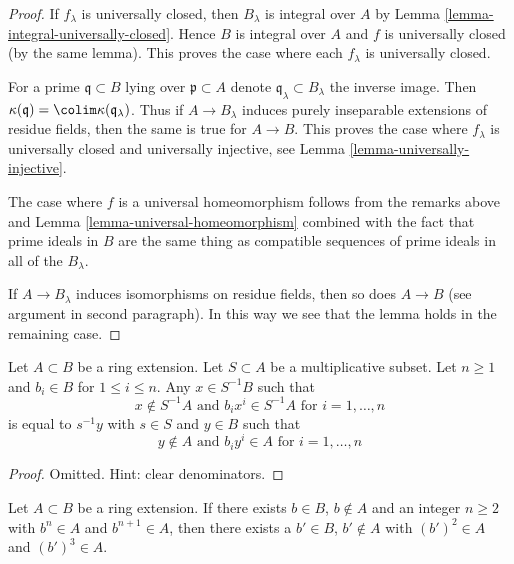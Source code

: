 \begin{proof}
If $f_\lambda$ is universally closed, then
$B_\lambda$ is integral over $A$ by
Lemma \ref{lemma-integral-universally-closed}.
Hence $B$ is integral over $A$ and $f$
is universally closed (by the same lemma).
This proves the case where each $f_\lambda$ is universally closed.

\medskip\noindent
For a prime $\mathfrak q \subset B$ lying over $\mathfrak p \subset A$
denote $\mathfrak q_\lambda \subset B_\lambda$ the inverse image.
Then $\kappa(\mathfrak q) = \colim \kappa(\mathfrak q_\lambda)$.
Thus if $A \to B_\lambda$ induces purely inseparable extensions
of residue fields, then the same is true for $A \to B$. This proves the case
where $f_\lambda$ is universally closed and universally injective, see
Lemma \ref{lemma-universally-injective}.

\medskip\noindent
The case where $f$ is a universal homeomorphism follows from
the remarks above and Lemma \ref{lemma-universal-homeomorphism}
combined with the fact that prime ideals in $B$ are the same thing
as compatible sequences of prime ideals in all of the $B_\lambda$.

\medskip\noindent
If $A \to B_\lambda$ induces isomorphisms on residue fields, then
so does $A \to B$ (see argument in second paragraph).
In this way we see that the lemma holds in the remaining case.
\end{proof}

\begin{lemma}
\label{lemma-special-elements-and-localization}
Let $A \subset B$ be a ring extension. Let $S \subset A$ be a
multiplicative subset. Let $n \geq 1$ and
$b_i \in B$ for $1 \leq i \leq n$. Any $x \in S^{-1}B$ such that
$$
x \not \in S^{-1}A\text{ and } b_i x^i \in S^{-1}A\text{ for }i = 1, \ldots, n
$$
is equal to $s^{-1}y$ with $s \in S$ and $y \in B$ such that
$$
y \not \in A\text{ and } b_i y^i \in A\text{ for }i = 1, \ldots, n
$$
\end{lemma}

\begin{proof}
Omitted. Hint: clear denominators.
\end{proof}

\begin{lemma}
\label{lemma-nth-and-nplusone-implies-square-and-cube}
Let $A \subset B$ be a ring extension. If there exists
$b \in B$, $b \not \in A$ and an integer $n \geq 2$ with
$b^n \in A$ and $b^{n + 1} \in A$, then there exists a
$b' \in B$, $b' \not \in A$
with $(b')^2 \in A$ and $(b')^3 \in A$.
\end{lemma}

